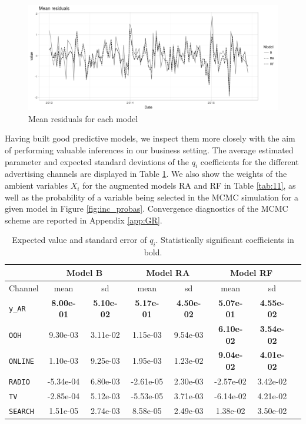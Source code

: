 \begin{figure}[h]
\centering
\includegraphics[scale=0.6]{figures/resis.png}
\caption{Mean residuals for each model}\label{fig:residuals}
\end{figure}

Having built good predictive models, we inspect them more closely with the aim of performing valuable inferences in our business setting. The average estimated parameter and expected standard deviations of the $q_i$ coefficients for the different advertising channels are displayed in Table \ref{tab:1}. We also show the weights of the ambient variables $X_i$ for the augmented models RA and RF in Table \ref{tab:11}, as well as the probability of a variable being selected in the MCMC simulation for a given model in Figure \ref{fig:inc_probas}. Convergence diagnostics of the MCMC scheme are reported in Appendix \ref{app:GR}.




\begin{table}[h]
\centering
\begin{tabular}{ |l|c|c|c|c|c|c|c| }
  \hline
  & \multicolumn{2}{|c|}{Model B} & \multicolumn{2}{|c|}{Model RA} & \multicolumn{2}{|c|}{Model RF}\\
  \hline
  Channel & mean & sd & mean & sd & mean & sd\\
  \hline
  \texttt{y\_AR} & \textbf{8.00e-01} & \textbf{5.10e-02} &  \textbf{5.17e-01} &  \textbf{4.50e-02} &  \textbf{5.07e-01} &  \textbf{4.55e-02}   \\
  \texttt{OOH} & 9.30e-03 & 3.11e-02 & 1.15e-03 & 9.54e-03  & \textbf{6.10e-02} &  \textbf{3.54e-02}\\
  \texttt{ONLINE} & 1.10e-03 & 9.25e-03  & 1.95e-03 &  1.23e-02 & \textbf{9.04e-02} & \textbf{4.01e-02}\\
  \texttt{RADIO} & -5.34e-04 & 6.80e-03  &-2.61e-05 & 2.30e-03 &   -2.57e-02 & 3.42e-02\\
  \texttt{TV} & -2.85e-04 & 5.12e-03 & -5.53e-05 & 3.71e-03  & -6.14e-02 & 4.21e-02\\
  \texttt{SEARCH} & 1.51e-05  & 2.74e-03  & 8.58e-05 & 2.49e-03  & 1.38e-02 & 3.50e-02 \\
    \hline
\end{tabular} \caption{Expected value and standard error of  $q_i$. Statistically significant coefficients  in bold.}\label{tab:1}
\end{table}

